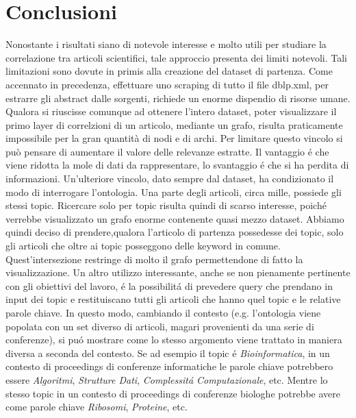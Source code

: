 \documentclass[11pt,a4paper]{article}
\begin{document}
\section{Conclusioni}
\label{sec:conclusions}
Nonostante i risultati siano di notevole interesse e molto utili per studiare la correlazione tra articoli scientifici, tale approccio presenta dei limiti notevoli. Tali limitazioni sono dovute in primis alla creazione del dataset di partenza. Come accennato in precedenza, effettuare uno scraping di tutto il file dblp.xml, per estrarre gli abstract dalle sorgenti, richiede un enorme dispendio di risorse umane. Qualora si riuscisse comunque ad ottenere l'intero dataset, poter visualizzare il primo layer di correlzioni di un articolo, mediante un grafo, risulta praticamente impossibile per la gran quantità di nodi e di archi. Per limitare questo vincolo si può pensare di aumentare il valore delle relevanze estratte. Il vantaggio \'e che viene ridotta la mole di dati da rappresentare, lo svantaggio \'e che si ha perdita di informazioni.\newline
Un'ulteriore vincolo, dato sempre dal dataset, ha condizionato il modo di interrogare l'ontologia. Una parte degli articoli, circa mille, possiede gli stessi topic. Ricercare solo per topic risulta quindi di scarso interesse, poich\'e verrebbe visualizzato un grafo enorme contenente quasi mezzo dataset. Abbiamo quindi deciso di prendere,qualora l'articolo di partenza possedesse dei topic, solo gli articoli che oltre ai topic posseggono delle keyword in comune. Quest'intersezione restringe di molto il grafo permettendone di fatto la visualizzazione.  \newline \newline
Un altro utilizzo interessante, anche se non pienamente pertinente con gli obiettivi del lavoro, \'e la possibilit\'a di prevedere query che prendano in input dei topic e restituiscano tutti gli articoli che hanno quel topic e le relative parole chiave. In questo modo, cambiando il contesto (e.g. l'ontologia viene popolata con un set diverso di articoli, magari provenienti da una serie di conferenze), si pu\'o mostrare come lo stesso argomento viene trattato in maniera diversa a seconda del contesto. Se ad esempio il topic \'e \emph{Bioinformatica}, in un contesto di proceedings di conferenze informatiche le parole chiave potrebbero essere \emph{Algoritmi}, \emph{Strutture Dati}, \emph{Complessit\'a Computazionale}, etc. Mentre lo stesso topic in un contesto di proceedings di conferenze biologhe potrebbe avere come parole chiave \emph{Ribosomi}, \emph{Proteine}, etc. 
\end{document}
